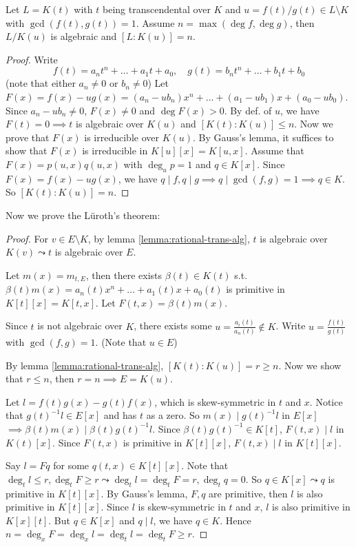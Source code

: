 \begin{lemma} \label{lemma:rational-trans-alg}
  Let $L = K(t)$ with $t$ being transcendental over $K$ and $u = f(t) / g(t) \in L \setminus K$
  with $\gcd(f(t), g(t)) = 1$.
  Assume $n = \max(\deg f, \deg g)$, then $L/K(u)$ is algebraic and $[L: K(u)] = n$.
  \begin{proof}
    Write
    \[ f(t) = a_n t^n + \dots + a_1 t + a_0, \quad g(t) = b_n t^n + \dots + b_1 t + b_0 \]
    (note that either $a_n \ne 0$ or $b_n \ne 0$)
    Let $F(x) = f(x) - ug(x) = (a_n - ub_n) x^n + \dots + (a_1 - ub_1)x + (a_0 - ub_0)$.
    Since $a_n - ub_n \ne 0$, $F(x) \ne 0$ and $\deg F(x) > 0$.
    By def. of $u$, we have $F(t) = 0 \implies t$ is algebraic over $K(u)$ and
    $[K(t):K(u)] \le n$.
    Now we prove that $F(x)$ is irreducible over $K(u)$.
    By Gauss's lemma, it suffices to show that $F(x)$ is irreducible in
    $K[u][x] = K[u, x]$.
    Assume that $F(x) = p(u, x) q(u, x)$ with $\deg_u p = 1$ and $q \in K[x]$.
    Since $F(x) = f(x) - ug(x)$, we have
    $q \mid f, q\mid g \implies q \mid \gcd(f, g) = 1 \implies q \in K$.
    So $[K(t):K(u)] = n$.
  \end{proof}
\end{lemma}

Now we prove the L\"{u}roth's theorem:
\begin{proof}
  For $v \in E \setminus K$, by lemma \ref{lemma:rational-trans-alg},
  $t$ is algebraic over $K(v) \leadsto t$ is algebraic over $E$.

  Let $m(x) = m_{t,E}$, then there exists $\beta(t) \in K(t)$ s.t.
  $\beta(t)m(x) = a_n(t)x^n + \dots + a_1(t)x + a_0(t)$ is primitive
  in $K[t][x] = K[t, x]$. Let $F(t, x) = \beta(t)m(x)$.

  Since $t$ is not algebraic over $K$, there exists some $u = \frac{a_i(t)}{a_n(t)} \not\in K$.
  Write $u = \frac{f(t)}{g(t)}$ with $\gcd(f, g) = 1$.
  (Note that $u \in E$)

  By lemma \ref{lemma:rational-trans-alg}, $[K(t): K(u)] = r \ge n$.
  Now we show that $r \le n$, then $r = n \implies E = K(u)$.

  Let $l = f(t)g(x) - g(t)f(x)$, which is skew-symmetric in $t$ and $x$.
  Notice that $g(t)^{-1} l \in E[x]$ and has $t$ as a zero.
  So $m(x) \mid g(t)^{-1} l$ in $E[x]$ $\implies \beta(t)m(x) \mid \beta(t)g(t)^{-1} l$.
  Since $\beta(t)g(t)^{-1} \in K[t]$, $F(t, x) \mid l$ in $K(t)[x]$.
  Since $F(t, x)$ is primitive in $K[t][x]$, $F(t, x) \mid l$ in $K[t][x]$.

  Say $l = Fq$ for some $q(t,x) \in K[t][x]$.
  Note that $\deg_t l \le r, \deg_t F \ge r \leadsto \deg_t l =\deg_t F = r,
  \deg_t q = 0$. So $q \in K[x] \leadsto q$ is primitive in $K[t][x]$.
  By Gauss's lemma, $F, q$ are primitive, then $l$ is also primitive in $K[t][x]$.
  Since $l$ is skew-symmetric in $t$ and $x$, $l$ is also primitive in $K[x][t]$.
  But $q\in K[x]$ and $q \mid l$, we have $q \in K$.
  Hence $n = \deg_x F = \deg_x l = \deg_t l  = \deg_t F \ge r$.
\end{proof}

